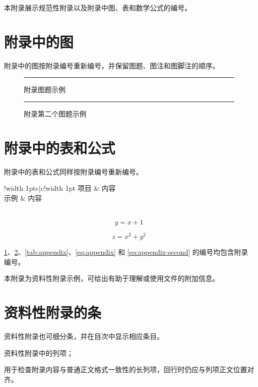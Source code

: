 \label{appendix:normative}
本附录展示规范性附录以及附录中图、表和数学公式的编号。

\section{附录中的图}
附录中的图按附录编号重新编号，并保留图题、图注和图脚注的顺序。

\begin{figure}[htb]
    \centering
    \rule{3cm}{2cm}
    \caption{附录图题示例}
    \label{fig:appendix}
\end{figure}

\begin{figure}[htb]
    \centering
    \rule{3cm}{2cm}
    \caption{附录第二个图题示例}
    \label{fig:appendix-second}
\end{figure}

\section{附录中的表和公式}
附录中的表和公式同样按附录编号重新编号。

\begin{table}[htb]
    \caption{附录表题示例}
    \label{tab:appendix}
    \centering{}\songti
    \setlength{\arrayrulewidth}{1pt}
    \begin{tabular}{!{\vrule width 1pt}c|c!{\vrule width 1pt}}
        \hline
        项目 & 内容 \\
        \hline
        示例 & 内容 \\
        \hline
        \\
        \hline
    \end{tabular}
\end{table}

\begin{equation}
    y = x + 1
    \label{eq:appendix}
\end{equation}

\begin{equation}
    z = x^2 + y^2
    \label{eq:appendix-second}
\end{equation}

\ref{fig:appendix}、\ref{fig:appendix-second}、\ref{tab:appendix}、\eqref{eq:appendix} 和 \eqref{eq:appendix-second} 的编号均包含附录编号。

\label{appendix:informative}
本附录为资料性附录示例，可给出有助于理解或使用文件的附加信息。

\section{资料性附录的条}
资料性附录也可细分条，并在目次中显示相应条目。

\begin{stdlist}
    \item 资料性附录中的列项；
    \item 用于检查附录内容与普通正文格式一致性的长列项，回行时仍应与列项正文位置对齐。
\end{stdlist}
